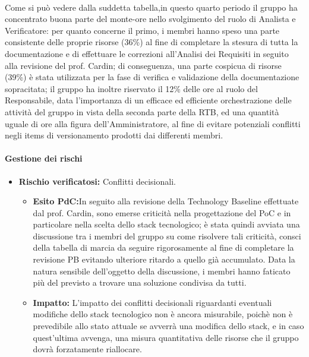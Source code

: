 \paragraph{}
Come si può vedere dalla suddetta tabella,in questo quarto periodo il gruppo ha concentrato buona parte del monte-ore nello svolgimento
del ruolo di Analista e Verificatore: per quanto concerne il primo, i membri hanno speso una parte consistente delle proprie
risorse  (36\%) al fine di completare la stesura di tutta la documentazione e di effettuare le correzioni all'Analisi dei Requisiti
in seguito alla revisione del prof. Cardin; di conseguenza, una parte cospicua di risorse (39\%) è stata utilizzata per la fase di verifica 
e validazione della documentazione sopracitata; il gruppo ha inoltre riservato il 12\% delle ore al ruolo del Responsabile, data l'importanza di un efficace
ed efficiente orchestrazione delle attività del gruppo in vista della seconda parte della RTB, ed una quantità uguale di ore alla figura dell'Amministratore, al fine
di evitare potenziali conflitti negli items di versionamento prodotti dai differenti membri.

\paragraph{Gestione dei rischi}

\begin{itemize}
    \item \textbf{Rischio verificatosi:} Conflitti decisionali.
    \begin{itemize}
        \item \textbf{Esito PdC:}In seguito alla revisione della Technology Baseline effettuate dal prof. Cardin, sono emerse criticità nella progettazione
        del PoC e in particolare nella scelta dello stack tecnologico; è stata quindi avviata una discussione tra i membri del gruppo su come risolvere tali criticità,
        consci della tabella di marcia da seguire rigorosamente al fine di completare la revisione PB evitando ulteriore ritardo a quello già accumulato. Data la 
        natura sensibile dell'oggetto della discussione, i membri hanno faticato più del previsto a trovare una soluzione condivisa da tutti.
        \item \textbf{Impatto:} L'impatto dei conflitti decisionali riguardanti eventuali modifiche dello stack tecnologico non è ancora misurabile, poichè non è
        prevedibile allo stato attuale  se avverrà una modifica dello stack, e in caso quest'ultima avvenga, una misura quantitativa delle risorse che il gruppo dovrà
        forzatamente riallocare.
    \end{itemize}
\end{itemize}